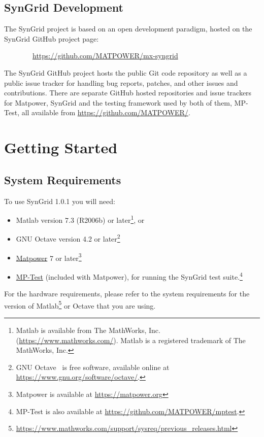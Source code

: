 \documentclass[12pt]{article}
\newcommand{\matlab}[0]{{\sc Matlab}}
\newcommand{\matpower}[0]{{\sc Matpower}}
\newcommand{\matpowerurl}[0]{https://matpower.org}
\newcommand{\matpowerlink}[0]{\href{\matpowerurl}{\matpower{}}}
\newcommand{\mptest}[0]{{MP-Test}}
\newcommand{\mptesturl}[0]{https://github.com/MATPOWER/mptest}
\newcommand{\mptestlink}[0]{\href{\mptesturl}{\mptest{}}}
\newcommand{\syngrid}[0]{{SynGrid}}
\newcommand{\syngridver}[0]{1.0.1}
\newcommand{\syngridurl}[0]{https://github.com/MATPOWER/mx-syngrid}
\numberwithin{equation}{section}
\numberwithin{table}{section}
\numberwithin{figure}{section}
\begin{document}
\subsection{\syngrid{} Development}
\label{sec:development}

The \syngrid{} project is based on an open development paradigm, hosted on the \syngrid{} GitHub project page:

\bigskip

~~~~~~~~\url{\syngridurl}

\bigskip

The \syngrid{} GitHub project hosts the public Git code repository as well as a public issue tracker for handling bug reports, patches, and other issues and contributions. There are separate GitHub hosted repositories and issue trackers for \matpower{}, \syngrid{} and the testing framework used by both of them, \mptest{}, all available from \url{https://github.com/MATPOWER/}.


\section{Getting Started}

\subsection{System Requirements}
\label{sec:sysreq}
To use \syngrid{} \syngridver{} you will need:
\begin{itemize}
\item \matlab{}\textsuperscript{\tiny \textregistered} version 7.3 (R2006b) or later\footnote{\matlab{} is available from The MathWorks, Inc. (\url{https://www.mathworks.com/}). \matlab{} is a registered trademark of The MathWorks, Inc.}, or
\item GNU Octave version 4.2 or later\footnote{GNU Octave~\cite{octave} is free software, available online at \url{https://www.gnu.org/software/octave/}.}
\item \matpowerlink{} 7 or later\footnote{\matpower{} is available at \url{\matpowerurl}}
\item \mptestlink{} (included with \matpower{}), for running the \syngrid{} test suite.\footnote{\mptest{} is also available at \url{\mptesturl}.}
\end{itemize}

For the hardware requirements, please refer to the system requirements for the version of \matlab{}\footnote{\url{https://www.mathworks.com/support/sysreq/previous_releases.html}} or Octave that you are using.
\end{document}
